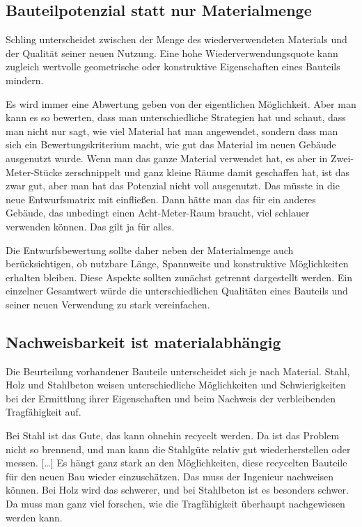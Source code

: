 \subsection{Bauteilpotenzial statt nur Materialmenge}

Schling unterscheidet zwischen der Menge des wiederverwendeten Materials und der Qualität seiner neuen Nutzung. Eine hohe Wiederverwendungsquote kann zugleich wertvolle geometrische oder konstruktive Eigenschaften eines Bauteils mindern.

\begin{Blockquote}
Es wird immer eine Abwertung geben von der eigentlichen Möglichkeit. Aber man kann es so bewerten, dass man unterschiedliche Strategien hat und schaut, dass man nicht nur sagt, wie viel Material hat man angewendet, sondern dass man sich ein Bewertungskriterium macht, wie gut das Material im neuen Gebäude ausgenutzt wurde. Wenn man das ganze Material verwendet hat, es aber in Zwei-Meter-Stücke zerschnippelt und ganz kleine Räume damit geschaffen hat, ist das zwar gut, aber man hat das Potenzial nicht voll ausgenutzt. Das müsste in die neue Entwurfsmatrix mit einfließen. Dann hätte man das für ein anderes Gebäude, das unbedingt einen Acht-Meter-Raum braucht, viel schlauer verwenden können. Das gilt ja für alles.
\end{Blockquote}

Die Entwurfsbewertung sollte daher neben der Materialmenge auch berücksichtigen, ob nutzbare Länge, Spannweite und konstruktive Möglichkeiten erhalten bleiben. Diese Aspekte sollten zunächst getrennt dargestellt werden. Ein einzelner Gesamtwert würde die unterschiedlichen Qualitäten eines Bauteils und seiner neuen Verwendung zu stark vereinfachen.

\subsection{Nachweisbarkeit ist materialabhängig}

Die Beurteilung vorhandener Bauteile unterscheidet sich je nach Material. Stahl, Holz und Stahlbeton weisen unterschiedliche Möglichkeiten und Schwierigkeiten bei der Ermittlung ihrer Eigenschaften und beim Nachweis der verbleibenden Tragfähigkeit auf.

\begin{Blockquote}
Bei Stahl ist das Gute, das kann ohnehin recycelt werden. Da ist das Problem nicht so brennend, und man kann die Stahlgüte relativ gut wiederherstellen oder messen. […] Es hängt ganz stark an den Möglichkeiten, diese recycelten Bauteile für den neuen Bau wieder einzuschätzen. Das muss der Ingenieur nachweisen können. Bei Holz wird das schwerer, und bei Stahlbeton ist es besonders schwer. Da muss man ganz viel forschen, wie die Tragfähigkeit überhaupt nachgewiesen werden kann.
\end{Blockquote}


